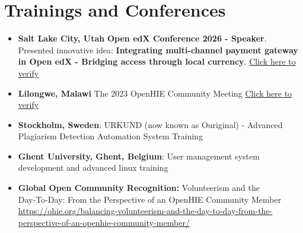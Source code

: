 \documentclass[11pt,a4paper]{article}
\begin{document}
\section*{ Trainings and Conferences}
\begin{itemize}[leftmargin=*,noitemsep,topsep=0pt]
  \item {} \textbf{Salt Lake City, Utah} \textbf{Open edX Conference 2026 - Speaker}. Presented innovative idea: \textbf{Integrating multi-channel payment gateway in Open edX - Bridging access through local currency}. \href{https://con.openedx.org/}{ Click here to verify}
  \item {} \textbf{Lilongwe, Malawi} The 2023 OpenHIE Community Meeting \href{https://ohie.org/ohie23/}{ Click here to verify}
  \item {} \textbf{Stockholm, Sweden}: URKUND (now known as Ouriginal) - Advanced Plagiarism Detection Automation System Training
  \item {} \textbf{Ghent University, Ghent, Belgium}: User management system development and advanced linux training
  \item {} \textbf{Global Open Community Recognition:} 
  Volunteerism and the Day‑To‑Day: From the Perspective of an OpenHIE Community Member
  \href{https://ohie.org/balancing-volunteerism-and-the-day-to-day-from-the-perspective-of-an-openhie-community-member/}{https://ohie.org/balancing-volunteerism-and-the-day-to-day-from-the-perspective-of-an-openhie-community-member/}
\end{itemize}

\end{document}
